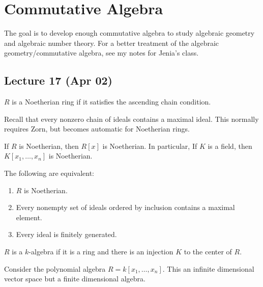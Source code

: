 \documentclass[10pt, twoside]{article}
\begin{document}
        \section{Commutative Algebra}
        The goal is to develop enough commutative algebra to study algebraic geometry and algebraic number theory. For a better treatment of the algebraic geometry/commutative algebra, see my notes for Jenia's class.

        \subsection{Lecture 17 (Apr 02)}

        \begin{defn}
            $R$ is a Noetherian ring if it satisfies the ascending chain condition.
        \end{defn}

        Recall that every nonzero chain of ideals contains a maximal ideal. This normally requires Zorn, but becomes automatic for Noetherian rings.

        \begin{exm}
            If $R$ is Noetherian, then $R[x]$ is Noetherian.
            In particular, If $K$ is a field, then $K[x_1, \ldots, x_n]$ is Noetherian.
        \end{exm}

        \begin{thm}
            The following are equivalent:
            \begin{enumerate}
                \item $R$ is Noetherian.
                \item Every nonempty set of ideals ordered by inclusion contains a maximal element.
                \item Every ideal is finitely generated.
            \end{enumerate}
        \end{thm}

        \begin{defn}[$k$-algebra]
            $R$ is a $k$-algebra if it is a ring and there is an injection $K$ to the center of $R$.
        \end{defn}

        \begin{exm}
            Consider the polynomial algebra $R = k[x_1, \ldots, x_n]$. This an infinite dimensional vector space but a finite dimensional algebra.
        \end{exm}
\end{document}
